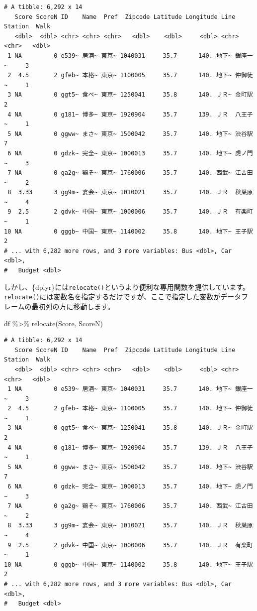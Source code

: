 \documentclass[
  a4paper,
  pandoc,
  ja=standard,
  jafont=haranoaji]{bxjsbook}
\newenvironment{Shaded}{\begin{snugshade}}{\end{snugshade}}
\newcommand{\FunctionTok}[1]{\textcolor[rgb]{0.28,0.35,0.67}{#1}}
\newcommand{\NormalTok}[1]{\textcolor[rgb]{0.00,0.48,0.65}{#1}}
\newcommand{\SpecialCharTok}[1]{\textcolor[rgb]{0.37,0.37,0.37}{#1}}
\begin{document}
\begin{verbatim}
# A tibble: 6,292 x 14
   Score ScoreN ID    Name  Pref  Zipcode Latitude Longitude Line  Station  Walk
   <dbl>  <dbl> <chr> <chr> <chr>   <dbl>    <dbl>     <dbl> <chr> <chr>   <dbl>
 1 NA         0 e539~ 居酒~ 東京~ 1040031     35.7      140. 地下~ 銀座一~     3
 2  4.5       2 gfeb~ 本格~ 東京~ 1100005     35.7      140. 地下~ 仲御徒~     1
 3 NA         0 ggt5~ 食べ~ 東京~ 1250041     35.8      140. ＪＲ~ 金町駅      2
 4 NA         0 g181~ 博多~ 東京~ 1920904     35.7      139. ＪＲ  八王子~     1
 5 NA         0 ggww~ まさ~ 東京~ 1500042     35.7      140. 地下~ 渋谷駅      7
 6 NA         0 gdzk~ 完全~ 東京~ 1000013     35.7      140. 地下~ 虎ノ門~     3
 7 NA         0 ga2g~ 鶏そ~ 東京~ 1760006     35.7      140. 西武~ 江古田~     2
 8  3.33      3 gg9m~ 宴会~ 東京~ 1010021     35.7      140. ＪＲ  秋葉原~     4
 9  2.5       2 gdvk~ 中国~ 東京~ 1000006     35.7      140. ＪＲ  有楽町~     1
10 NA         0 gggb~ 中国~ 東京~ 1140002     35.8      140. 地下~ 王子駅      2
# ... with 6,282 more rows, and 3 more variables: Bus <dbl>, Car <dbl>,
#   Budget <dbl>
\end{verbatim}

しかし、\{dplyr\}には\texttt{relocate()}というより便利な専用関数を提供しています。\texttt{relocate()}には変数名を指定するだけですが、ここで指定した変数がデータフレームの最初列の方に移動します。

\begin{Shaded}
\begin{Highlighting}[numbers=left,,]
\NormalTok{df }\SpecialCharTok{\%\textgreater{}\%}
  \FunctionTok{relocate}\NormalTok{(Score, ScoreN)}
\end{Highlighting}
\end{Shaded}

\begin{verbatim}
# A tibble: 6,292 x 14
   Score ScoreN ID    Name  Pref  Zipcode Latitude Longitude Line  Station  Walk
   <dbl>  <dbl> <chr> <chr> <chr>   <dbl>    <dbl>     <dbl> <chr> <chr>   <dbl>
 1 NA         0 e539~ 居酒~ 東京~ 1040031     35.7      140. 地下~ 銀座一~     3
 2  4.5       2 gfeb~ 本格~ 東京~ 1100005     35.7      140. 地下~ 仲御徒~     1
 3 NA         0 ggt5~ 食べ~ 東京~ 1250041     35.8      140. ＪＲ~ 金町駅      2
 4 NA         0 g181~ 博多~ 東京~ 1920904     35.7      139. ＪＲ  八王子~     1
 5 NA         0 ggww~ まさ~ 東京~ 1500042     35.7      140. 地下~ 渋谷駅      7
 6 NA         0 gdzk~ 完全~ 東京~ 1000013     35.7      140. 地下~ 虎ノ門~     3
 7 NA         0 ga2g~ 鶏そ~ 東京~ 1760006     35.7      140. 西武~ 江古田~     2
 8  3.33      3 gg9m~ 宴会~ 東京~ 1010021     35.7      140. ＪＲ  秋葉原~     4
 9  2.5       2 gdvk~ 中国~ 東京~ 1000006     35.7      140. ＪＲ  有楽町~     1
10 NA         0 gggb~ 中国~ 東京~ 1140002     35.8      140. 地下~ 王子駅      2
# ... with 6,282 more rows, and 3 more variables: Bus <dbl>, Car <dbl>,
#   Budget <dbl>
\end{verbatim}
\end{document}
